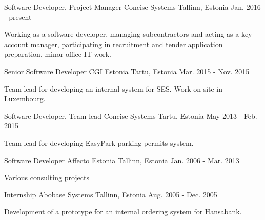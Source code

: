 \begin{cventries}
  
  \cventry
    {Software Developer, Project Manager}
    {Concise Systems}
    {Tallinn, Estonia}
    {Jan. 2016 - present}
    {
      \begin{cvitems}
        \item {Working as a software developer, managing subcontractors and acting as a key account manager, participating in recruitment and tender application preparation, minor office IT work.}
      \end{cvitems}
    }
  \cventry
    {Senior Software Developer}
    {CGI Estonia}
    {Tartu, Estonia}
    {Mar. 2015 - Nov. 2015}
    {
      \begin{cvitems}
        \item {Team lead for developing an internal system for SES. Work on-site in Luxembourg.}
      \end{cvitems}
    }
  \cventry
    {Software Developer, Team lead}
    {Concise Systems}
    {Tartu, Estonia}
    {May 2013 - Feb. 2015}
    {
      \begin{cvitems}
        \item {Team lead for developing EasyPark parking permits system.}
      \end{cvitems}
    }
  \cventry
    {Software Developer}
    {Affecto Estonia}
    {Tallinn, Estonia}
    {Jan. 2006 - Mar. 2013}
    {
      \begin{cvitems}
        \item {Various consulting projects}
      \end{cvitems}
    }
  \cventry
    {Internship}
    {Abobase Systems}
    {Tallinn, Estonia}
    {Aug. 2005 - Dec. 2005}
    {
      \begin{cvitems}
        \item {Development of a prototype for an internal ordering system for Hansabank.}
      \end{cvitems}
    }
\end{cventries}
